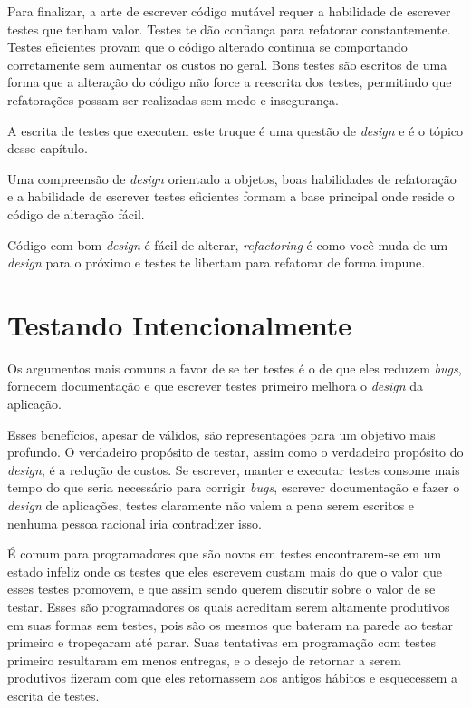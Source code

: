 Para finalizar, a arte de escrever código mutável requer a habilidade de escrever testes que tenham valor. Testes te dão confiança para refatorar constantemente. Testes eficientes provam que o código alterado continua se comportando corretamente sem aumentar os custos no geral. Bons testes são escritos de uma forma que a alteração do código não force a reescrita dos testes, permitindo que refatorações possam ser realizadas sem medo e insegurança.

A escrita de testes que executem este truque é uma questão de \textit{design} e é o tópico desse capítulo.

Uma compreensão de \textit{design} orientado a objetos, boas habilidades de refatoração e a habilidade de escrever testes eficientes formam a base principal onde reside o código de alteração fácil.

Código com bom \textit{design} é fácil de alterar, \textit{refactoring} é como você muda de um \textit{design} para o próximo e testes te libertam para refatorar de forma impune.

\section{Testando Intencionalmente}

Os argumentos mais comuns a favor de se ter testes é o de que eles reduzem \textit{bugs}, fornecem documentação e que escrever testes primeiro melhora o \textit{design} da aplicação.

Esses benefícios, apesar de válidos, são representações para um objetivo mais profundo. O verdadeiro propósito de testar, assim como o verdadeiro propósito do \textit{design}, é a redução de custos. Se escrever, manter e executar testes consome mais tempo do que seria necessário para corrigir \textit{bugs}, escrever documentação e fazer o \textit{design} de aplicações, testes claramente não valem a pena serem escritos e nenhuma pessoa racional iria contradizer isso.

É comum para programadores que são novos em testes encontrarem-se em um estado infeliz onde os testes que eles escrevem custam mais do que o valor que esses testes promovem, e que assim sendo querem discutir sobre o valor de se testar. Esses são programadores os quais acreditam serem altamente produtivos em suas formas sem testes, pois são os mesmos que bateram na parede ao testar primeiro e tropeçaram até parar. Suas tentativas em programação com testes primeiro resultaram em menos entregas, e o desejo de retornar a serem produtivos fizeram com que eles retornassem aos antigos hábitos e esquecessem a escrita de testes.

